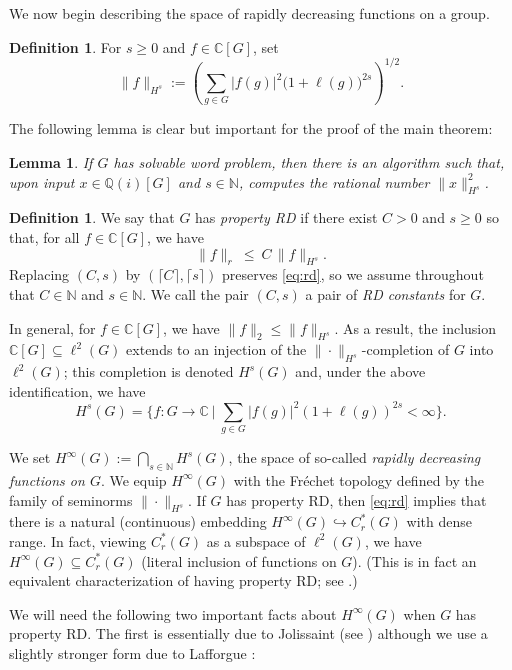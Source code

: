 \documentclass[10pt,a4paper]{amsart}
\newcommand{\C}{\mathbb{C}}
\newcommand{\N}{\mathbb{N}}
\newcommand{\Cr}{C^*_r(G)}
\theoremstyle{plain}
\newtheorem{lemma}[theorem]{Lemma}
\theoremstyle{definition}
\newtheorem{definition}[theorem]{Definition}
\numberwithin{equation}{section}
\begin{document}
We now begin describing the space of rapidly decreasing functions on a group.

\begin{definition}\label{def:rd}
For $s\ge0$ and $f\in \mathbb{C}[G]$, set
\[
\|f\|_{H^s}:=\left(\sum_{g\in G}|f(g)|^2\big(1+\ell(g)\big)^{2s}\right)^{1/2}.
\]
\end{definition}

The following lemma is clear but important for the proof of the main theorem:

\begin{lemma}\label{sobolevcomp}
If $G$ has solvable word problem, then there is an algorithm such that, upon input $x\in \mathbb{Q}(i)[G]$ and $s\in \N$, computes the rational number $\|x\|_{H^s}^2$.
\end{lemma}

\begin{definition}
We say that $G$ has \emph{property RD} if there exist $C>0$ and $s\ge0$ so that, for all $f\in \mathbb{C}[G]$, we have
\begin{equation}\label{eq:rd}
\|f\|_r\ \le\ C\,\|f\|_{H^s}.
\end{equation}
Replacing $(C,s)$ by $(\lceil C\rceil,\lceil s\rceil)$ preserves \eqref{eq:rd}, so we assume throughout that $C\in\N$ and $s\in\N$.  We call the pair $(C,s)$ a pair of \emph{RD constants} for $G$.
\end{definition}

In general, for $f\in \mathbb{C}[G]$, we have $\|f\|_2\le\|f\|_{H^s}$.  As a result, the inclusion $\C[G]\subseteq\ell^2(G)$ extends to an injection of the $\|\cdot\|_{H^s}$-completion of $G$ into $\ell^2(G)$; this completion is denoted $H^s(G)$ and, under the above identification, we have
\[
H^s(G)=\Big\{f:G\to\C\ \Big|\ \textstyle\sum_{g\in G}|f(g)|^2(1+\ell(g))^{2s}<\infty\Big\}.
\] 

We set $H^\infty(G):=\bigcap_{s\in\N}H^s(G)$, the space of so-called \emph{rapidly decreasing functions on $G$}.  We equip $H^\infty(G)$ with the Fr\'echet topology defined by the family of seminorms $\|\cdot\|_{H^s}$.  If $G$ has property RD, then \eqref{eq:rd} implies that there is a natural (continuous) embedding $H^\infty(G)\hookrightarrow\Cr$ with dense range.  In fact, viewing $C^*_r(G)$ as a subspace of $\ell^2(G)$, we have $H^\infty(G)\subseteq C^*_r(G)$ (literal inclusion of functions on $G$).  (This is in fact an equivalent characterization of having property RD; see \cite[Proposition 4.1]{chatterji}.)

We will need the following two important facts about $H^\infty(G)$ when $G$ has property RD.  The first is essentially due to Jolissaint (see \cite[Lemma 1.2.4]{jolissaint}) although we use a slightly stronger form due to Lafforgue \cite{lafforgue}:
\end{document}
